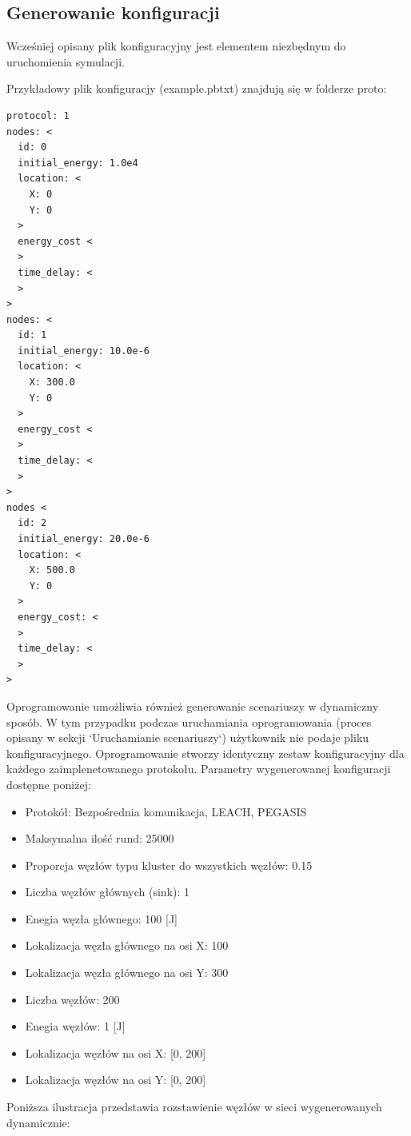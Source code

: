 \documentclass[a4paper,12pt,twoside,openany]{report}
\begin{document}
\subsection{Generowanie konfiguracji}

Wcześniej opisany plik konfiguracyjny jest elementem niezbędnym do uruchomienia symulacji.

Przykładowy plik konfiguracjy (example.pbtxt) znajdują się w folderze proto:

\begin{lstlisting}
protocol: 1
nodes: <
  id: 0
  initial_energy: 1.0e4
  location: <
    X: 0
    Y: 0
  >
  energy_cost <
  >
  time_delay: <
  >
>
nodes: <
  id: 1
  initial_energy: 10.0e-6
  location: <
    X: 300.0
    Y: 0
  >
  energy_cost <
  >
  time_delay: <
  >
>
nodes <
  id: 2
  initial_energy: 20.0e-6
  location: <
    X: 500.0
    Y: 0
  >
  energy_cost: <
  >
  time_delay: <
  >
>
\end{lstlisting}

Oprogramowanie umożliwia również generowanie scenariuszy w dynamiczny sposób.
W tym przypadku podczas uruchamiania oprogramowania (proces opisany w sekcji `Uruchamianie scenariuszy`)
użytkownik nie podaje pliku konfiguracyjnego. Oprogramowanie stworzy identyczny zestaw konfiguracyjny
dla każdego zaimplenetowanego protokołu. Parametry wygenerowanej konfiguracji dostępne poniżej:

\begin{itemize}
 \item Protokół: Bezpośrednia komunikacja, LEACH, PEGASIS
 \item Maksymalna ilość rund: 25000
 \item Proporcja węzłów typu kluster do wszystkich węzłów: 0.15
 \item Liczba węzłów głównych (sink): 1
 \item Enegia węzła głównego: 100 [J]
 \item Lokalizacja węzła głównego na osi X: 100
 \item Lokalizacja węzła głównego na osi Y: 300
 \item Liczba węzłów: 200
 \item Enegia węzłów: 1 [J]
 \item Lokalizacja węzłów na osi X: [0, 200]
 \item Lokalizacja węzłów na osi Y: [0, 200]
\end{itemize}

Poniższa ilustracja przedstawia rozstawienie węzłów w sieci wygenerowanych dynamicznie:
\end{document}
